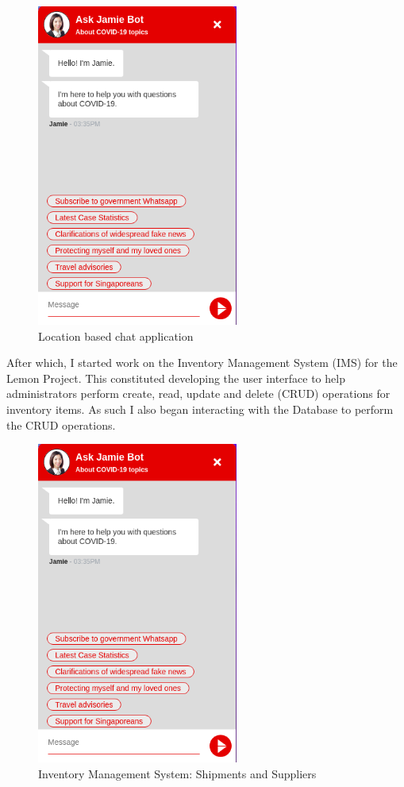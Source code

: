 \begin{figure}[h!]
	\begin{center}
		\includegraphics[width=250px]{assets/images/govsg-chatbot.png}
		\caption{Location based chat application}
		\label{fig:govsg-chatbot}
	\end{center}
\end{figure}

\noindent
After which, I started work on the Inventory Management System (IMS) for the Lemon Project. This constituted
developing the user interface to help administrators perform create, read, update and delete (CRUD) operations
for inventory items. As such I also began interacting with the Database to perform the CRUD operations.

\begin{figure}[h!]
	\begin{center}
		\includegraphics[width=250px]{assets/images/govsg-chatbot.png}
		\caption{Inventory Management System: Shipments and Suppliers}
		\label{fig:govsg-chatbot}
	\end{center}
\end{figure}


